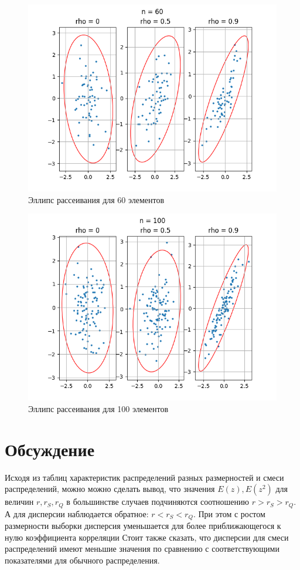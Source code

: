 \documentclass[12pt,a4paper]{article}
\begin{document}
\begin{figure}[H]
    \centering
    \includegraphics[scale=0.85]{images/ellipses60.png}
    \caption{Эллипс рассеивания для 60 элементов}
\end{figure}

\begin{figure}[H]
    \centering
    \includegraphics[scale=0.85]{images/ellipses100.png}
    \caption{Эллипс рассеивания для 100 элементов}
\end{figure}

\section{Обсуждение}
Исходя из таблиц характеристик распределений разных размерностей и смеси распределений, можно можно сделать вывод, что значения $E(z),E(z^2)$ для величин $r,r_S,r_Q$ в большинстве случаев подчиняются соотношению $r>r_S>r_Q$. А для дисперсии наблюдается обратное: $r<r_S<r_Q$. При этом с ростом размерности выборки дисперсия уменьшается для более приближающегося к нулю коэффициента корреляции Стоит также сказать, что дисперсии для смеси распределений имеют меньшие значения по сравнению с соответствующими показателями для обычного распределения.
\end{document}

